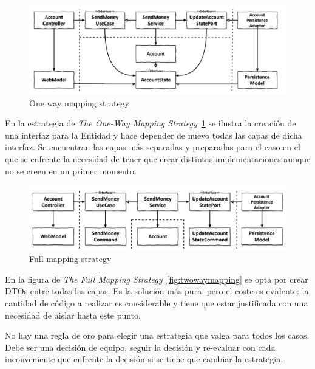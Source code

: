 \begin{figure}[H]
    \centering
    \includegraphics[height=0.1\textheight]{./part/Ejecucion/Seguimiento/CreateTaskUseCase/img/onWaymapping}
    \caption{One way mapping strategy~\cite{TomHombergs2019GYHD}}\label{fig:onWaymapping}
\end{figure}

En la estrategia de \textit{The One-Way Mapping Strategy}~\cref{fig:onWaymapping} se ilustra la creación de una interfaz para la Entidad y hace depender de nuevo todas las capas de dicha interfaz.
Se encuentran las capas más separadas y preparadas para el caso en el que se enfrente la necesidad de tener que crear distintas implementaciones aunque no se creen en un primer momento.

\begin{figure}[H]
    \centering
    \includegraphics[height=0.1\textheight]{./part/Ejecucion/Seguimiento/CreateTaskUseCase/img/fullmapping}
    \caption{Full mapping strategy~\cite{TomHombergs2019GYHD}}\label{fig:fullmapping}
\end{figure}

En la figura de \textit{The Full Mapping Strategy}~\cref{fig:twowaymapping} se opta por crear DTOs entre todas las capas.
Es la solución más pura, pero el coste es evidente: la cantidad de código a realizar es considerable y tiene que estar justificada con una necesidad de aislar hasta este punto.

No hay una regla de oro para elegir una estrategia que valga para todos los casos.
Debe ser una decisión de equipo, seguir la decisión y re-evaluar con cada inconveniente que enfrente la decisión si se tiene que cambiar la estrategia.

